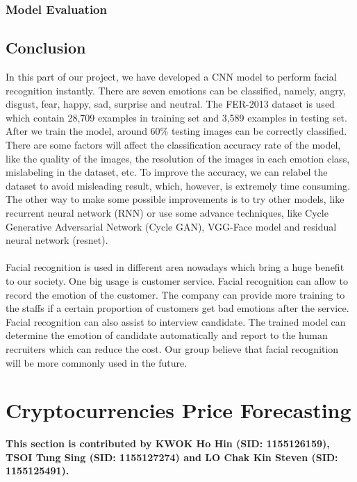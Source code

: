\documentclass[11pt,a4paper]{article}
\begin{document}
    \subsubsection{Model Evaluation}
    
    
    \subsection{Conclusion}
    In this part of our project, we have developed a CNN model to perform facial recognition instantly. There are seven emotions can be classified, namely, angry, disgust, fear, happy, sad, surprise and neutral. The FER-2013 dataset is used which contain 28,709 examples in training set and 3,589 examples in testing set. After we train the model, around 60\% testing images can be correctly classified. There are some factors will affect the classification accuracy rate of the model, like the quality of the images, the resolution of the images in each emotion class, mislabeling in the dataset, etc. To improve the accuracy, we can relabel the dataset to avoid misleading result, which, however, is extremely time consuming. The other way to make some possible improvements is to try other models, like recurrent neural network (RNN) or use some advance techniques, like Cycle Generative Adversarial Network (Cycle GAN), VGG-Face model and residual neural network (resnet). \\
    \\
    Facial recognition is used in different area nowadays which bring a huge benefit to our society. One big usage is customer service. Facial recognition can allow to record the emotion of the customer. The company can provide more training to the staffs if a certain proportion of customers get bad emotions after the service. Facial recognition can also assist to interview candidate. The trained model can determine the emotion of candidate automatically and report to the human recruiters which can reduce the cost. Our group believe that facial recognition will be more commonly used in the future.

    
    \newpage
    \section{Cryptocurrencies Price Forecasting}
    \textbf{This section is contributed by KWOK Ho Hin (SID: 1155126159), TSOI Tung Sing (SID: 1155127274) and LO Chak Kin Steven (SID: 1155125491).}
    
\end{document}
